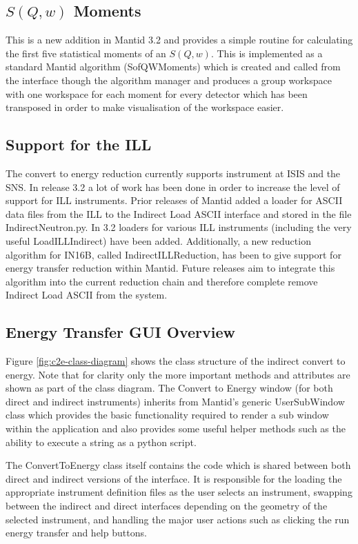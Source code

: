\documentclass[paper=a4, fontsize=11pt]{scrartcl}	%
\numberwithin{equation}{section}															%
\numberwithin{figure}{section}																%
\numberwithin{table}{section}																%
\begin{document}
\subsection{$S(Q,w)$ Moments}
This is a new addition in Mantid 3.2 and provides a simple routine for calculating the first five statistical moments of an $S(Q,w)$. This is implemented as a standard Mantid algorithm (SofQWMoments) which is created and called from the interface though the algorithm manager and produces a group workspace with one workspace for each moment for every detector which has been transposed in order to make visualisation of the workspace easier.

\subsection{Support for the ILL}
The convert to energy reduction currently supports instrument at ISIS and the SNS. In release 3.2 a lot of work has been done in order to increase the level of support for ILL instruments. Prior releases of Mantid added a loader for ASCII data files from the ILL to the Indirect Load ASCII interface and stored in the file IndirectNeutron.py. In 3.2 loaders for various ILL instruments (including the very useful LoadILLIndirect) have been added. Additionally, a new reduction algorithm for IN16B, called IndirectILLReduction, has been to give support for energy transfer reduction within Mantid. Future releases aim to integrate this algorithm into the current reduction chain and therefore complete remove Indirect Load ASCII from the system.

\subsection{Energy Transfer GUI Overview}
\label{subsec:c2e-gui-overview}
Figure \ref{fig:c2e-class-diagram} shows the class structure of the indirect convert to energy. Note that for clarity only the more important methods and attributes are shown as part of the class diagram. The Convert to Energy window (for both direct and indirect instruments) inherits from Mantid's generic UserSubWindow class which provides the basic functionality required to render a sub window within the application and also provides some useful helper methods such as the ability to execute a string as a python script.

The ConvertToEnergy class itself contains the code which is shared between both direct and indirect versions of the interface. It is responsible for the loading the appropriate instrument definition files as the user selects an instrument, swapping between the indirect and direct interfaces depending on the geometry of the selected instrument, and handling the major user actions such as clicking the run energy transfer and help buttons.
\end{document}
